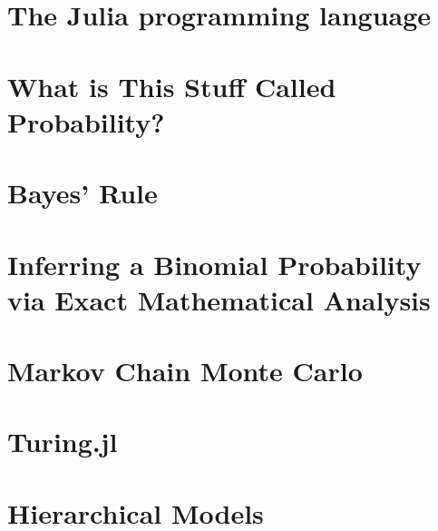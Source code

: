 \documentclass[
  letterpaper,
  DIV=11,
  numbers=noendperiod]{scrreprt}
\begin{document}

\hypertarget{the-julia-programming-language}{%
\chapter{The Julia programming
language}\label{the-julia-programming-language}}


\hypertarget{what-is-this-stuff-called-probability}{%
\chapter{What is This Stuff Called
Probability?}\label{what-is-this-stuff-called-probability}}


\hypertarget{bayes-rule}{%
\chapter{Bayes' Rule}\label{bayes-rule}}


\hypertarget{inferring-a-binomial-probability-via-exact-mathematical-analysis}{%
\chapter{Inferring a Binomial Probability via Exact Mathematical
Analysis}\label{inferring-a-binomial-probability-via-exact-mathematical-analysis}}


\hypertarget{markov-chain-monte-carlo}{%
\chapter{Markov Chain Monte Carlo}\label{markov-chain-monte-carlo}}


\hypertarget{turing.jl}{%
\chapter{Turing.jl}\label{turing.jl}}


\hypertarget{hierarchical-models}{%
\chapter{Hierarchical Models}\label{hierarchical-models}}
\end{document}
